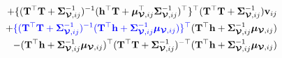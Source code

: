 \documentclass[12pt]{article}
\newcommand{\0}{\mathbf{0}}
\begin{document}
\begin{eqnarray*}
&& + \{ ( \mathbf{T}^{\top} \mathbf{T} + \boldsymbol{\Sigma}_{\boldsymbol{\mathcal{V}}, ij}^{-1} )^{-1} ( \mathbf{h}^{\top} \mathbf{T} + \boldsymbol{\mu}_{\boldsymbol{\mathcal{V}}, ij}^{\top} \boldsymbol{\Sigma}_{\boldsymbol{\mathcal{V}}, ij}^{-1})^{\top} \}^{\top} ( \mathbf{T}^{\top} \mathbf{T} + \boldsymbol{\Sigma}_{\boldsymbol{\mathcal{V}}, ij}^{-1} ) \mathbf{v}_{ij} \\
&& + \textcolor{blue}{\{ ( \mathbf{T}^{\top} \mathbf{T} + \boldsymbol{\Sigma}_{\boldsymbol{\mathcal{V}}, ij}^{-1} )^{-1}  ( \mathbf{T}^{\top} \mathbf{h} + \boldsymbol{\Sigma}_{\boldsymbol{\mathcal{V}}, ij}^{-1}\boldsymbol{\mu}_{\boldsymbol{\mathcal{V}}, ij} ) \}^{\top}}    ( \mathbf{T}^{\top} \mathbf{h} + \boldsymbol{\Sigma}_{\boldsymbol{\mathcal{V}}, ij}^{-1}\boldsymbol{\mu}_{\boldsymbol{\mathcal{V}}, ij} ) \\
&&- ( \mathbf{T}^{\top} \mathbf{h} + \boldsymbol{\Sigma}_{\boldsymbol{\mathcal{V}}, ij}^{-1}\boldsymbol{\mu}_{\boldsymbol{\mathcal{V}}, ij} )^{\top}   ( \mathbf{T}^{\top} \mathbf{T} + \boldsymbol{\Sigma}_{\boldsymbol{\mathcal{V}}, ij}^{-1} )^{-\top}  ( \mathbf{T}^{\top} \mathbf{h} + \boldsymbol{\Sigma}_{\boldsymbol{\mathcal{V}}, ij}^{-1}\boldsymbol{\mu}_{\boldsymbol{\mathcal{V}}, ij} )
\end{eqnarray*}
\end{document}
